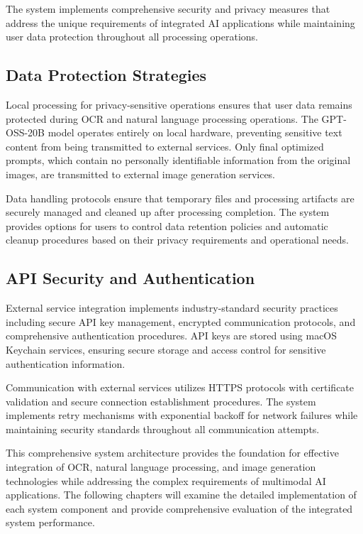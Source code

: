 The system implements comprehensive security and privacy measures that address the unique requirements of integrated AI applications while maintaining user data protection throughout all processing operations.

\subsection{Data Protection Strategies}

Local processing for privacy-sensitive operations ensures that user data remains protected during OCR and natural language processing operations. The GPT-OSS-20B model operates entirely on local hardware, preventing sensitive text content from being transmitted to external services. Only final optimized prompts, which contain no personally identifiable information from the original images, are transmitted to external image generation services.

Data handling protocols ensure that temporary files and processing artifacts are securely managed and cleaned up after processing completion. The system provides options for users to control data retention policies and automatic cleanup procedures based on their privacy requirements and operational needs.

\subsection{API Security and Authentication}

External service integration implements industry-standard security practices including secure API key management, encrypted communication protocols, and comprehensive authentication procedures. API keys are stored using macOS Keychain services, ensuring secure storage and access control for sensitive authentication information.

Communication with external services utilizes HTTPS protocols with certificate validation and secure connection establishment procedures. The system implements retry mechanisms with exponential backoff for network failures while maintaining security standards throughout all communication attempts.

This comprehensive system architecture provides the foundation for effective integration of OCR, natural language processing, and image generation technologies while addressing the complex requirements of multimodal AI applications. The following chapters will examine the detailed implementation of each system component and provide comprehensive evaluation of the integrated system performance.